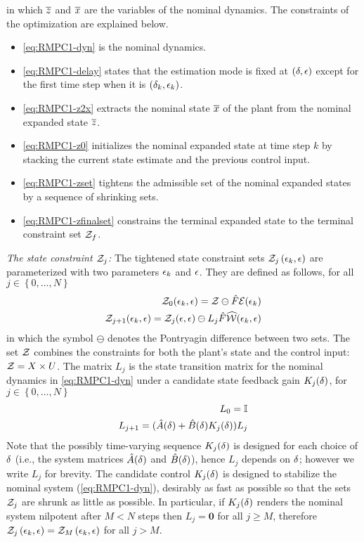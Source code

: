 in which $\overline{z}$ and $\overline{x}$
are the variables of the nominal dynamics. The constraints of the
optimization are explained below.
\begin{itemize}
\item \eqref{eq:RMPC1-dyn} is the nominal dynamics.
\item \eqref{eq:RMPC1-delay} states that the estimation mode is fixed at $\left(\delta,\epsilon\right)$
except for the first time step when it is $\left(\delta_k,\epsilon_k\right)$.
\item \eqref{eq:RMPC1-z2x} extracts the nominal state $\overline{x}$ of the plant
from the nominal expanded state $\overline{z}$.
\item \eqref{eq:RMPC1-z0} initializes the nominal expanded state at time step
$k$ by stacking the current state estimate and the previous control
input.
\item \eqref{eq:RMPC1-zset} tightens the admissible set of the nominal expanded
states by a sequence of shrinking sets.
\item \eqref{eq:RMPC1-zfinalset} constrains the terminal expanded state to
the terminal constraint set $\mathcal{Z}_{f}$.
\end{itemize}

\noindent\textit{The state constraint $\mathcal{Z}_{j}$:}
%
The tightened state constraint sets $\mathcal{Z}_{j}\left(\epsilon_k,\epsilon\right)$
are parameterized with two parameters $\epsilon_k$ and $\epsilon$.
They are defined as follows, for all $j\in\left\{ 0,\dots,N\right\} $
\begin{eqnarray}
\mathcal{Z}_{0}(\epsilon_k,\epsilon)=\mathcal{Z}\ominus\hat{F} \mathcal{E}(\epsilon_k)\label{eq:RMPC1-Z0}
\\
\mathcal{Z}_{j+1}(\epsilon_k,\epsilon)=\mathcal{Z}_{j}(\epsilon,\epsilon)\ominus L_{j}\hat{F}\widehat{\mathcal{W}}(\epsilon_k,\epsilon)\label{eq:RMPC1-Zj}
\label{eq:RMPC1-Z}
\end{eqnarray} 
in which the symbol $\ominus$
denotes the Pontryagin difference between two sets. The set $\mathcal{Z}$
combines the constraints for both the plant's state and the control
input: $\mathcal{Z}=X\times U$. The matrix $L_{j}$ is the state
transition matrix for the nominal dynamics in \eqref{eq:RMPC1-dyn} under
a candidate state feedback gain $K_{j}(\delta)$, for $j\in\left\{ 0,\dots,N\right\}$
\begin{eqnarray}
\label{eq:RMPC1-L}
L_{0}=\mathbb{I}\label{eq:RMPC1-L0}\\
L_{j+1}=(\hat{A}(\delta)+\hat{B}(\delta)K_{j}(\delta))L_{j}\label{eq:RMPC1-Lj}
\end{eqnarray}
Note that the possibly time-varying sequence $K_{j}(\delta)$ is designed for each choice of $\delta$ (i.e., the system matrices $\hat{A}(\delta)$ and $\hat{B}(\delta)$), hence $L_{j}$ depends on $\delta$; however we write $L_{j}$ for brevity. The candidate control $K_{j}(\delta)$ is designed to stabilize the nominal system (\ref{eq:RMPC1-dyn}), desirably as fast as possible so that the sets $\mathcal{Z}_{j}$ are shrunk as little as possible. In particular, if $K_{j}(\delta)$ renders the nominal system nilpotent after $M<N$ steps then $L_{j}=\bm{0}$ for all $j\geq M$, therefore $\mathcal{Z}_{j}\left(\epsilon_k,\epsilon\right)=\mathcal{Z}_{M}\left(\epsilon_k,\epsilon\right)$ for all $j>M$.


